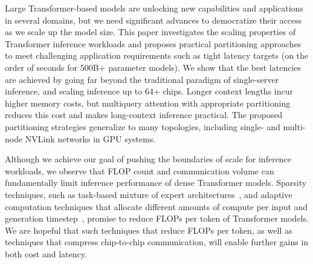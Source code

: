 Large Transformer-based models are unlocking new capabilities and applications in several domains, but we need significant advances to democratize their access as we scale up the model size. This paper investigates the scaling properties of Transformer inference workloads and proposes practical partitioning approaches to meet challenging application requirements such as tight latency targets (on the order of seconds for 500B+ parameter models). We show that the best latencies are achieved by going far beyond the traditional paradigm of single-server inference, and scaling inference up to 64+ chips. Longer context lengths incur higher memory costs, but multiquery attention with appropriate partitioning reduces this cost and makes long-context inference practical. The proposed partitioning strategies generalize to many topologies, including single- and multi-node NVLink networks in GPU systems. 

Although we achieve our goal of pushing the boundaries of scale for inference workloads, we observe that FLOP count and communication volume can fundamentally limit inference performance of dense Transformer models. Sparsity techniques, such as task-based mixture of expert architectures~\cite{fedus2022review, kudugunta2021beyond, lepikhin2020gshard, shazeer2017outrageously}, and adaptive computation techniques that allocate different amounts of compute per input and generation timestep~\cite{jaszczur2021sparse,schuster2022confident}, promise to reduce FLOPs per token of Transformer models. We are hopeful that such techniques that reduce FLOPs per token, as well as techniques that compress chip-to-chip communication, will enable further gains in both cost and latency.


